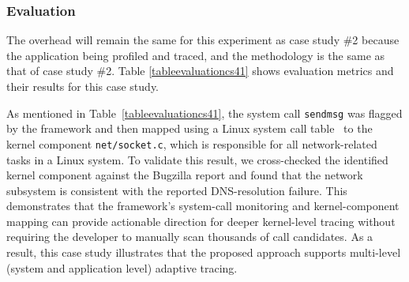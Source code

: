 \documentclass[pdflatex,sn-nature]{sn-jnl}%
\theoremstyle{thmstyleone}%
\theoremstyle{thmstyletwo}%
\theoremstyle{thmstylethree}%
\begin{document}
\subsubsection{Evaluation}
The overhead will remain the same for this experiment as case study \#2 because the application being profiled and traced, and the methodology is the same as that of case study \#2. Table \ref{tableevaluationcs41} shows evaluation metrics and their results for this case study.


\begin{table}[tbp]

\centering
{}
\caption{Evaluation | Issue: Slow Startup Of Firefox If Network Connectivity Issue Exists| Case Study: 4}
\label{tableevaluationcs41}
\end{table}

As mentioned in Table~\ref{tableevaluationcs41}, the system call \texttt{sendmsg} was flagged by the framework and then mapped using a Linux system call table~\cite{valsorda-no-date} to the kernel component \texttt{net/socket.c}, which is responsible for all network-related tasks in a Linux system. To validate this result, we cross-checked the identified kernel component against the Bugzilla report and found that the network subsystem is consistent with the reported DNS-resolution failure. This demonstrates that the framework's system-call monitoring and kernel-component mapping can provide actionable direction for deeper kernel-level tracing without requiring the developer to manually scan thousands of call candidates. As a result, this case study illustrates that the proposed approach supports multi-level (system and application level) adaptive tracing.
\end{document}
